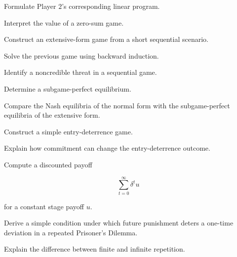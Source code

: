 \begin{exercise}[3]
Formulate Player \(2\)'s corresponding linear program.
\end{exercise}

\begin{exercise}[3]
Interpret the value of a zero-sum game.
\end{exercise}

\begin{exercise}[3]
Construct an extensive-form game from a short sequential scenario.
\end{exercise}

\begin{exercise}[3]
Solve the previous game using backward induction.
\end{exercise}

\begin{exercise}[3]
Identify a noncredible threat in a sequential game.
\end{exercise}

\begin{exercise}[3]
Determine a subgame-perfect equilibrium.
\end{exercise}

\begin{exercise}[3]
Compare the Nash equilibria of the normal form with the subgame-perfect
equilibria of the extensive form.
\end{exercise}

\begin{exercise}[3]
Construct a simple entry-deterrence game.
\end{exercise}

\begin{exercise}[3]
Explain how commitment can change the entry-deterrence outcome.
\end{exercise}

\begin{exercise}[3]
Compute a discounted payoff

\[
\sum_{t=0}^{\infty}
\delta^tu
\]

for a constant stage payoff \(u\).
\end{exercise}

\begin{exercise}[3]
Derive a simple condition under which future punishment deters a one-time
deviation in a repeated Prisoner's Dilemma.
\end{exercise}

\begin{exercise}[3]
Explain the difference between finite and infinite repetition.
\end{exercise}

